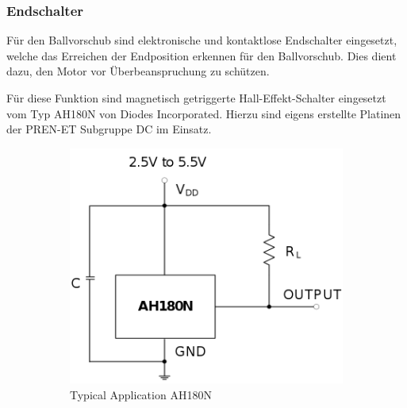 \subsubsection{Endschalter}
Für den Ballvorschub sind elektronische und kontaktlose Endschalter
eingesetzt, welche das Erreichen der Endposition erkennen für den
Ballvorschub. Dies dient dazu, den Motor vor Überbeanspruchung zu schützen. 

Für diese Funktion sind magnetisch getriggerte Hall-Effekt-Schalter
eingesetzt vom Typ AH180N von Diodes Incorporated. Hierzu sind eigens
erstellte Platinen der PREN-ET Subgruppe DC im Einsatz.

\begin{figure}[h!]
	\centering
	\begin{subfigure}[b]{0.45\textwidth}
		\centering
		\includegraphics[width=1\textwidth]{../../fig/et/ah180n.png}
		\caption{Typical Application AH180N}
	\end{subfigure}
	\begin{subfigure}[b]{0.45\textwidth}
		\centering

\end{subfigure}
\end{figure}
